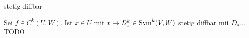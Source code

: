 \documentclass[class=article, crop=false]{standalone}
\begin{document}
\begin{zettel}{stetig diffbar}
\begin{flashcard}[x9gvugfl]{}
	\begin{definition}
		Sei $f \in C^k (U,W )$. Ist $x \in  U $ mit $x \mapsto D^k_x \in \operatorname{Sym}^k (V,W )$ stetig diffbar mit $D_a \dots$ TODO

	\end{definition}

\end{flashcard}
\end{zettel}
\end{document}
